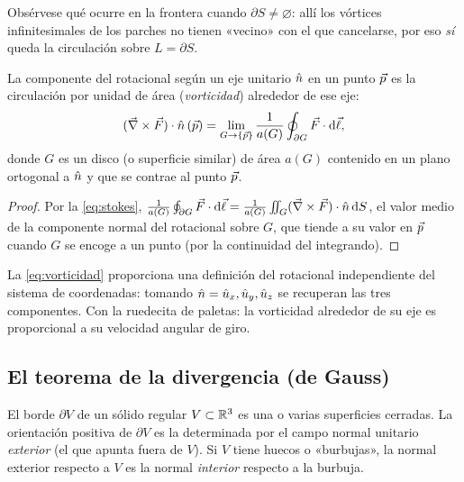 Obsérvese qué ocurre en la frontera cuando $\partial S\neq\varnothing$: allí los
vórtices infinitesimales de los parches no tienen «vecino» con el que
cancelarse, por eso \emph{sí} queda la circulación sobre $L=\partial S$.

\begin{proposicion}\label{prop:vorticidad}
La componente del rotacional según un eje unitario $\hat{n}$ en un punto $\vec{p}$ es
la circulación por unidad de área (\emph{vorticidad}) alrededor de ese eje:
\begin{equation}\label{eq:vorticidad}
  (\vec{\nabla}\times\vec{F})\cdot\hat{n}\,(\vec{p})=\lim_{G\to\{\vec{p}\}}\frac{1}{a(G)}\oint_{\partial G}\vec{F}\cdot\mathrm{d}\vec{\ell} ,
\end{equation}
donde $G$ es un disco (o superficie similar) de área $a(G)$ contenido en un plano
ortogonal a $\hat{n}$ y que se contrae al punto $\vec{p}$.
\end{proposicion}
\begin{proof}
Por la \cref{eq:stokes}, $\frac{1}{a(G)}\oint_{\partial G}\vec{F}\cdot\mathrm{d}\vec{\ell}=\frac{1}{a(G)}\iint_G(\vec{\nabla}\times\vec{F})\cdot\hat{n}\,\mathrm{d} S$,
el valor medio de la componente normal del rotacional sobre $G$, que tiende a su
valor en $\vec{p}$ cuando $G$ se encoge a un punto (por la continuidad del
integrando).
\end{proof}

La \cref{eq:vorticidad} proporciona una definición del rotacional independiente
del sistema de coordenadas: tomando $\hat{n}=\hat{u}_{x},\hat{u}_{y},\hat{u}_{z}$ se recuperan las tres
componentes. Con la ruedecita de paletas: la vorticidad alrededor de su eje es
proporcional a su velocidad angular de giro.



\subsection{El teorema de la divergencia (de Gauss)}\label{sec:gauss}
\begin{definicion}\label{def:borde-solido}
El borde $\partial V$ de un sólido regular $V\subset\mathbb{R}^{3}$ es una o varias
superficies cerradas. La orientación positiva de $\partial V$ es la determinada
por el campo normal unitario \emph{exterior} (el que apunta fuera de $V$). Si $V$
tiene huecos o «burbujas», la normal exterior respecto a $V$ es la normal
\emph{interior} respecto a la burbuja.
\end{definicion}

